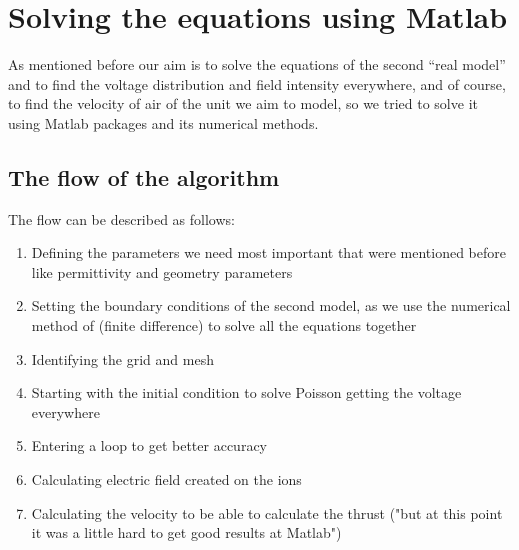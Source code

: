 \section*{Solving the equations using Matlab}
\hspace{\parindent}As mentioned before our aim is to solve the equations of the second “real model” and to find the voltage distribution and field intensity everywhere, and of course, to find the velocity of air of the unit we aim to model, so we tried to solve it using Matlab packages and its numerical methods.
\subsection*{The flow of the algorithm}
The flow can be described as follows:
\begin{enumerate}
    \item Defining the parameters we need most important that were mentioned before like permittivity and geometry parameters
    \item Setting the boundary conditions of the second model, as we use the numerical method of (finite difference) to solve all the equations together
    \item  Identifying the grid and mesh
    \item Starting with the initial condition to solve Poisson getting the voltage everywhere
    \item Entering a loop to get better accuracy
    \item Calculating electric field created on the ions
    \item Calculating the velocity to be able to calculate the thrust ("but at this point it was a little hard to get good results at Matlab")
\end{enumerate}
